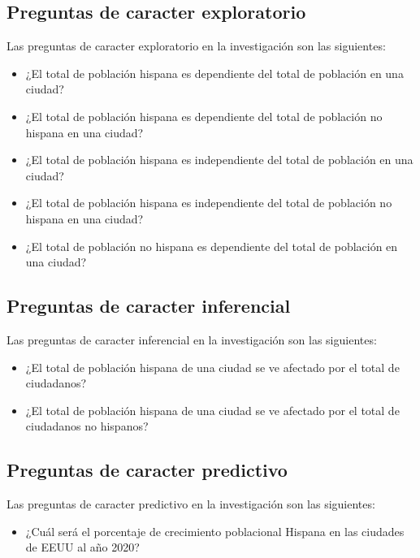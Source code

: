   \subsection{Preguntas de caracter exploratorio}
   Las preguntas de caracter exploratorio en la investigación son las siguientes:
  \begin{itemize}
   \item ¿El total de población hispana es dependiente del total de población en una ciudad?
   \item ¿El total de población hispana es dependiente del total de población no hispana en una ciudad?
   \item ¿El total de población hispana es independiente del total de población en una ciudad?
   \item ¿El total de población hispana es independiente del total de población no hispana en una ciudad?
   \item ¿El total de población no hispana es dependiente del total de población en una ciudad?

  \end{itemize}
  \subsection{Preguntas de caracter inferencial}
   Las preguntas de caracter inferencial en la investigación son las siguientes:
  \begin{itemize}
   \item ¿El total de población hispana de una ciudad se ve afectado por el total de ciudadanos?
   \item ¿El total de población hispana de una ciudad se ve afectado por el total de ciudadanos no hispanos?
  \end{itemize}
  
  \subsection{Preguntas de caracter predictivo}
   Las preguntas de caracter predictivo en la investigación son las siguientes:
	\begin{itemize}
		\item ¿Cuál será el porcentaje de crecimiento poblacional Hispana en las ciudades de EEUU al año 2020?
	\end{itemize}